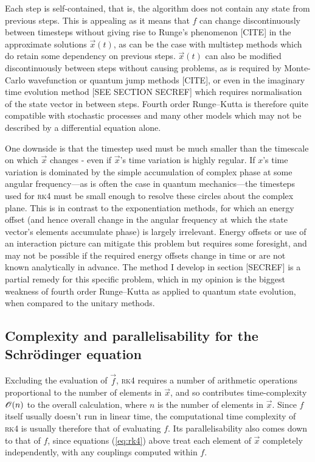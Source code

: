 Each step is self-contained, that is, the algorithm does not contain any state from previous steps. This is appealing as it means that $f$ can change discontinuously between timesteps without giving rise to Runge's phenomenon [CITE] in the approximate solutions $\vec x(t)$, as can be the case with multistep methods which do retain some dependency on previous steps.
$\vec x(t)$ can also be modified discontinuously between steps without causing problems, as is required by Monte-Carlo wavefunction or quantum jump methods [CITE], or even in the imaginary time evolution method [SEE SECTION SECREF] which requires normalisation of the state vector in between steps. Fourth order Runge--Kutta is therefore quite compatible with stochastic processes and many other models which may not be described by a differential equation alone.

One downside is that the timestep used must be much smaller than the timescale on which $\vec x$ changes - even if $\vec x$'s time variation is highly regular. If $x$'s time variation is dominated by the simple accumulation of complex phase at some angular frequency---as is often the case in quantum mechanics---the timesteps used for \textsc{rk4} must be small enough to resolve these circles about the complex plane. This is in contrast to the exponentiation methods, for which an energy offset (and hence overall change in the angular frequency at which the state vector's elements accumulate phase) is largely irrelevant. Energy offsets or use of an interaction picture can mitigate this problem but requires some foresight, and may not be possible if the required energy offsets change in time or are not known analytically in advance. The method I develop in section [SECREF] is a partial remedy for this specific problem, which in my opinion is the biggest weakness of fourth order Runge--Kutta as applied to quantum state evolution, when compared to the unitary methods.

\subsection{Complexity and parallelisability for the Schr\"odinger equation}

Excluding the evaluation of $\vec f$, \textsc{rk4} requires a number of arithmetic operations proportional to the number of elements in $\vec x$, and so contributes time-complexity $\mathscr{O}(n)$ to the overall calculation, where $n$ is the number of elements in $\vec x$. Since $f$ itself usually doesn't run in linear time, the computational time complexity of \textsc{rk4} is usually therefore that of evaluating $f$. Its parallelisability also comes down to that of $f$, since equations (\ref{eq:rk4}) above treat each element of $\vec x$ completely independently, with any couplings computed within $f$.

